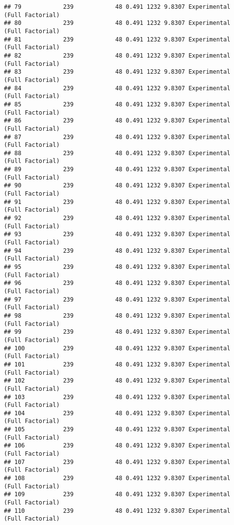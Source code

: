 \documentclass[]{article}
\begin{document}
\begin{verbatim}
## 79            239            48 0.491 1232 9.8307 Experimental (Full Factorial)
## 80            239            48 0.491 1232 9.8307 Experimental (Full Factorial)
## 81            239            48 0.491 1232 9.8307 Experimental (Full Factorial)
## 82            239            48 0.491 1232 9.8307 Experimental (Full Factorial)
## 83            239            48 0.491 1232 9.8307 Experimental (Full Factorial)
## 84            239            48 0.491 1232 9.8307 Experimental (Full Factorial)
## 85            239            48 0.491 1232 9.8307 Experimental (Full Factorial)
## 86            239            48 0.491 1232 9.8307 Experimental (Full Factorial)
## 87            239            48 0.491 1232 9.8307 Experimental (Full Factorial)
## 88            239            48 0.491 1232 9.8307 Experimental (Full Factorial)
## 89            239            48 0.491 1232 9.8307 Experimental (Full Factorial)
## 90            239            48 0.491 1232 9.8307 Experimental (Full Factorial)
## 91            239            48 0.491 1232 9.8307 Experimental (Full Factorial)
## 92            239            48 0.491 1232 9.8307 Experimental (Full Factorial)
## 93            239            48 0.491 1232 9.8307 Experimental (Full Factorial)
## 94            239            48 0.491 1232 9.8307 Experimental (Full Factorial)
## 95            239            48 0.491 1232 9.8307 Experimental (Full Factorial)
## 96            239            48 0.491 1232 9.8307 Experimental (Full Factorial)
## 97            239            48 0.491 1232 9.8307 Experimental (Full Factorial)
## 98            239            48 0.491 1232 9.8307 Experimental (Full Factorial)
## 99            239            48 0.491 1232 9.8307 Experimental (Full Factorial)
## 100           239            48 0.491 1232 9.8307 Experimental (Full Factorial)
## 101           239            48 0.491 1232 9.8307 Experimental (Full Factorial)
## 102           239            48 0.491 1232 9.8307 Experimental (Full Factorial)
## 103           239            48 0.491 1232 9.8307 Experimental (Full Factorial)
## 104           239            48 0.491 1232 9.8307 Experimental (Full Factorial)
## 105           239            48 0.491 1232 9.8307 Experimental (Full Factorial)
## 106           239            48 0.491 1232 9.8307 Experimental (Full Factorial)
## 107           239            48 0.491 1232 9.8307 Experimental (Full Factorial)
## 108           239            48 0.491 1232 9.8307 Experimental (Full Factorial)
## 109           239            48 0.491 1232 9.8307 Experimental (Full Factorial)
## 110           239            48 0.491 1232 9.8307 Experimental (Full Factorial)

\end{verbatim}
\end{document}

